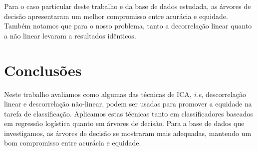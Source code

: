 \documentclass[11pt]{article}
\begin{document}
Para o caso particular deste trabalho e da base de dados estudada, as
árvores de decisão apresentaram um melhor compromisso entre acurácia e
equidade. Também notamos que para o nosso problema, tanto a decorrelação
linear quanto a não linear levaram a resultados idênticos.

    \section{Conclusões}\label{conclusuxf5es}

Neste trabalho avaliamos como algumas das técnicas de ICA, \emph{i.e},
descorrelação linear e descorrelação não-linear, podem ser usadas para
promover a equidade na tarefa de classificação. Aplicamos estas técnicas
tanto em classificadores baseados em regressão logística quanto em
árvores de decisão. Para a base de dados que investigamos, as árvores de
decisão se mostraram mais adequadas, mantendo um bom compromisso entre
acurácia e equidade.


    
    



    
    
\end{document}
